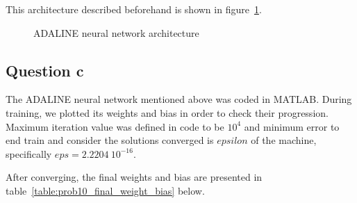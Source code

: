 This architecture described beforehand is shown in figure~\ref{fig:prob10_adaline_architecture}.
\begin{figure}[htpb]
	\centering
	
	\caption{ADALINE neural network architecture}
	\label{fig:prob10_adaline_architecture}
\end{figure}

\subsection{Question c}
The ADALINE neural network mentioned above was coded in MATLAB. During training, we plotted its weights and bias in order to check their progression. Maximum iteration value was defined in code to be $10^4$ and minimum error to end train and consider the solutions converged is $epsilon$ of the machine, specifically $eps = 2.2204\ 10^{-16}$.

After converging, the final weights and bias are presented in table~\ref{table:prob10_final_weight_bias} below. 

